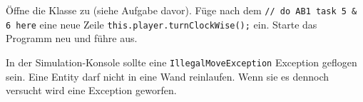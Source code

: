 

Öffne die Klasse zu  (siehe Aufgabe davor).
Füge nach dem \texttt{// do AB1 task 5 \& 6 here} eine neue Zeile \texttt{this.player.turnClockWise();} ein.
Starte das Programm neu und führe  aus.

In der Simulation-Konsole sollte eine \texttt{IllegalMoveException} Exception geflogen sein.
Eine Entity darf nicht in eine Wand reinlaufen.
Wenn sie es dennoch versucht wird eine Exception geworfen.